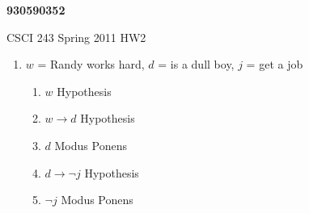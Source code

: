 \documentclass{article}
\begin{document}
\begin{center}
{\bf 930590352}

CSCI 243 Spring 2011 HW2
\end{center}

\begin{enumerate}

\item $w$ = Randy works hard, $d$ = is a dull boy, $j$ = get a job
 \begin{enumerate}
 \item $w$ \quad\quad Hypothesis
 \item $w \rightarrow d$ \quad Hypothesis
 \item $d$ \quad\quad Modus Ponens
 \item $d \rightarrow \neg j$ \quad Hypothesis
 \item $\neg j$ \quad\quad Modus Ponens
 \end{enumerate}


\end{enumerate}
\end{document}
